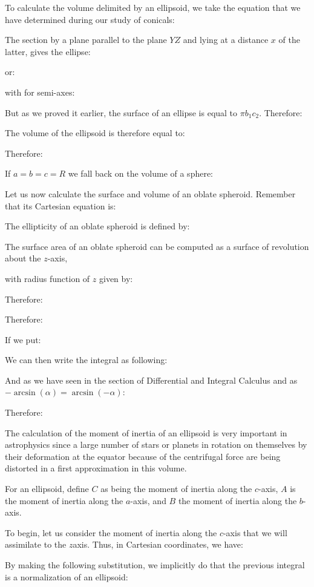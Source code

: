 {	To calculate the volume delimited by an ellipsoid, we take the equation that we have determined during our study of conicals:
	
	The section by a plane parallel to the plane $YZ$ and lying at a distance $x$ of the latter, gives the ellipse:
	
	or:
	
	with for semi-axes:
	
	But as we proved it earlier, the surface of an ellipse is equal to $\pi b_1c_2$. Therefore:
	
	The volume of the ellipsoid is therefore equal to:
	
	Therefore:
	
	If $a=b=c=R$ we fall back on the volume of a sphere:
	
	
	Let us now calculate the surface and volume of an oblate spheroid. Remember that its Cartesian equation is:
	
	The ellipticity of an oblate spheroid is defined by:
	
	The surface area of an oblate spheroid can be computed as a surface of revolution about the $z$-axis,
	
	with radius function of $z$ given by:
	
	Therefore:
	
	Therefore:
	
	If we put:
	
	We can then write the integral as following:
	
	And as we have seen in the section of Differential and Integral Calculus and as $-\arcsin(\alpha)=\arcsin(-\alpha)$:
	
	Therefore:
	
	The calculation of the moment of inertia of an ellipsoid is very important in astrophysics since a large number of stars or planets in rotation on themselves by their deformation at the equator because of the centrifugal force are being distorted in a first approximation in this volume.
	
	For an ellipsoid, define $C$ as being the moment of inertia along the $c$-axis, $A$ is the moment of inertia along the $a$-axis, and $B$ the moment of inertia along the $b$-axis.

	To begin, let us consider the moment of inertia along the $c$-axis that we will assimilate to the $z$axis. Thus, in Cartesian coordinates, we have:
	
	By making the following substitution, we implicitly do that the previous integral is a normalization of an ellipsoid:
	
}

